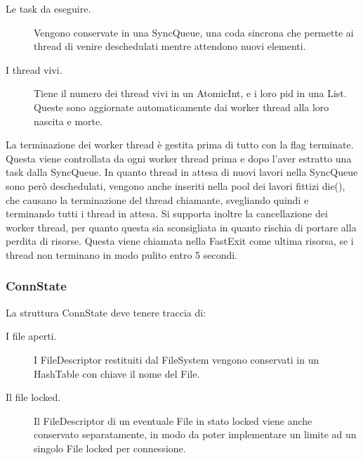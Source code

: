 \documentclass[11pt]{article}
\begin{document}
\begin{flushleft}
\begin{description}
\item[Le task da eseguire.] Vengono conservate in una SyncQueue, una coda sincrona che permette ai thread di venire deschedulati mentre attendono nuovi elementi.

\item[I thread vivi.] Tiene il numero dei thread vivi in un AtomicInt, e i loro pid in una List. Queste sono aggiornate automaticamente dai worker thread alla loro nascita e morte.

\end{description}

La terminazione dei worker thread è gestita prima di tutto con la flag terminate. Questa viene controllata da ogni worker thread prima e dopo l'aver estratto una task dalla SyncQueue. In quanto thread in attesa di nuovi lavori nella SyncQueue sono però deschedulati, vengono anche inseriti nella pool dei lavori fittizi die(), che causano la terminazione del thread chiamante, svegliando quindi e terminando tutti i thread in attesa.
Si supporta inoltre la cancellazione dei worker thread, per quanto questa sia sconsigliata in quanto rischia di portare alla perdita di risorse. Questa viene chiamata nella FastExit come ultima risorsa, se i thread non terminano in modo pulito entro 5 secondi.

\subsubsection{ConnState}

La struttura ConnState deve tenere traccia di:
\begin{description}

\item[I file aperti.] I FileDescriptor restituiti dal FileSystem vengono conservati in un HashTable con chiave il nome del File.

\item[Il file locked.] Il FileDescriptor di un eventuale File in stato locked viene anche conservato separatamente, in modo da poter implementare un limite ad un singolo File locked per connessione.


\end{description}
\end{flushleft}
\end{document}
